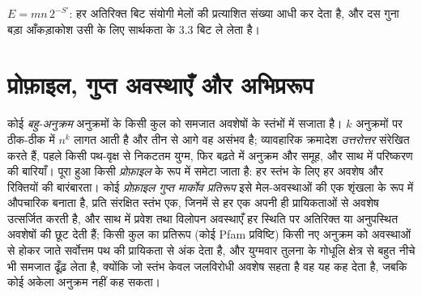 \begin{omfigure}

{\small $E = mn\,2^{-S'}$: हर अतिरिक्त बिट संयोगी मेलों की प्रत्याशित
संख्या आधी कर देता है, और दस गुना बड़ा आँकड़ाकोश उसी  के लिए
सार्थकता के $3.3$ बिट ले लेता है।}
\end{omfigure}

\section{प्रोफ़ाइल, गुप्त अवस्थाएँ और अभिप्ररूप}

\begin{definition}[बहु-संरेखण और प्रोफ़ाइल]\label{def:b3:bioinformatics:msa}
कोई \emph{बहु-अनुक्रम } अनुक्रमों के किसी कुल को समजात अवशेषों के
स्तंभों में सजाता है। $k$ अनुक्रमों पर ठीक-ठीक  में
$n^{k}$ लागत आती है और तीन से आगे वह असंभव है; व्यावहारिक क्रमादेश
\emph{उत्तरोत्तर} संरेखित करते हैं, पहले किसी पथ-वृक्ष से निकटतम युग्म,
फिर बढ़ते  में अनुक्रम और समूह, और साथ में परिष्करण की बारियाँ।
पूरा हुआ  किसी \emph{प्रोफ़ाइल} के रूप में समेटा जाता है: हर
स्तंभ के लिए हर अवशेष और रिक्तियों की बारंबारता। कोई
\emph{प्रोफ़ाइल गुप्त मार्कोव प्रतिरूप} इसे मेल-अवस्थाओं की एक शृंखला
के रूप में औपचारिक बनाता है, प्रति संरक्षित स्तंभ एक, जिनमें से हर एक
अपनी ही प्रायिकताओं से अवशेष उत्सर्जित करती है, और साथ में प्रवेश तथा
विलोपन अवस्थाएँ हर स्थिति पर अतिरिक्त या अनुपस्थित अवशेषों की छूट देती
हैं; किसी कुल का प्रतिरूप (कोई Pfam प्रविष्टि) किसी नए अनुक्रम को
अवस्थाओं से होकर जाते सर्वोत्तम पथ की प्रायिकता से अंक देता है, और
युग्मवार तुलना के गोधूलि क्षेत्र से बहुत नीचे भी समजात ढूँढ़ लेता है,
क्योंकि जो स्तंभ केवल जलविरोधी अवशेष सहता है वह यह कह देता है, जबकि
कोई अकेला अनुक्रम नहीं कह सकता।
\end{definition}

